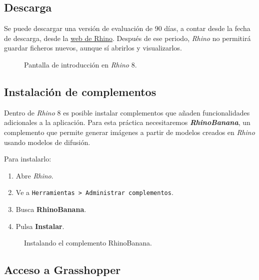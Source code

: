 \documentclass[
  spanish,
  11pt,
  a4paper,
  DIV=11,
  numbers=noendperiod]{scrartcl}
\providecommand{\tightlist}{\setlength{\itemsep}{0pt}\setlength{\parskip}{0pt}}
\begin{document}
\subsection{Descarga}
\label{descarga}

Se puede descargar una versión de evaluación de 90 días, a contar desde la fecha de descarga, desde la \href{https://www.rhino3d.com/download/}{web de Rhino}. Después de ese periodo, \emph{Rhino} no permitirá guardar ficheros nuevos, aunque sí abrirlos y visualizarlos.

\begin{figure}[H]
\caption{Pantalla de introducción en \emph{Rhino} 8.}\label{fig-rhino3d}
\end{figure}

\subsection{Instalación de complementos}
\label{instalacion-de-complementos}

Dentro de \emph{Rhino} 8 es posible instalar complementos que añaden funcionalidades adicionales a la aplicación. Para esta práctica necesitaremos \textbf{\emph{RhinoBanana}}, un complemento que permite generar imágenes a partir de modelos creados en \emph{Rhino} usando modelos de difusión.

Para instalarlo:

\begin{enumerate}
\tightlist
\item Abre \emph{Rhino}.
\item Ve a \texttt{Herramientas > Administrar complementos}.
\item Busca \textbf{RhinoBanana}.
\item Pulsa \textbf{Instalar}.
\end{enumerate}

\begin{figure}[H]
\caption{Instalando el complemento RhinoBanana.}\label{fig-install-rhino-banana}
\end{figure}

\subsection{Acceso a Grasshopper}
\label{acceso-a-grasshopper}
\end{document}

